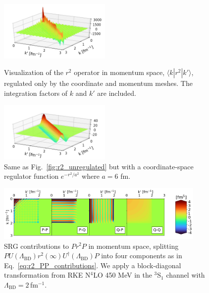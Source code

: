 \documentclass[10pt,aps,prc,floatfix,twocolumn,nofootinbib]{revtex4-1}
\newcommand{\LambdaBD}{{\Lambda_{\text{BD}}}}
\begin{document}
%
\begin{figure}[t!]
    \includegraphics[clip,width=0.48\textwidth]{r2_3d_plot_unregulated.png}%
    \caption{Visualization of the $r^2$ operator in momentum space, $\langle k | r^2 | k'\rangle$, regulated only by the coordinate and momentum meshes.
    The integration factors of $k$ and $k'$ are included.}
    \label{fig:r2_unregulated}
    
\medskip\smallskip

    \includegraphics[clip,width=0.48\textwidth]{r2_3d_plot_regulated_a6.png}%
    \caption{Same as Fig.~\ref{fig:r2_unregulated} but with a coordinate-space regulator function $e^{-r^2/a^2}$ where $a=6$ fm.}
    \label{fig:r2_regulated}
\end{figure}
%
\begin{figure}[htb]
    \includegraphics[clip,width=0.9\textwidth]{r2_srg_changes_kvnn_111_Block-diag.png}%
    \caption{SRG contributions to $P r^2 P$ in momentum space, splitting $PU(\LambdaBD)r^2(\infty)U^{\dagger}(\LambdaBD)P$ into four components as in Eq.~\eqref{eq:r2_PP_contributions}. We apply a block-diagonal transformation from RKE N$^4$LO 450 MeV in the $^3$S$_1$ channel with $\LambdaBD=2$\,fm$^{-1}$.}
    \label{fig:r2_srg_changes}
\end{figure}
%
\end{document}
